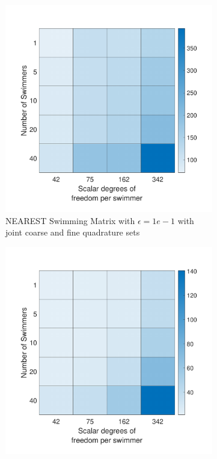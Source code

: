 \begin{figure}
\ContinuedFloat
    \begin{subfigure}{0.3\textwidth}
        \includegraphics[width=\linewidth]{Images/Condition/Mobility Matrix using Contained NEAREST-1.pdf}
        \caption{NEAREST Swimming Matrix with $\epsilon=1e-1$ with joint coarse and fine quadrature sets}        
    \end{subfigure}
    \begin{subfigure}{0.3\textwidth}
        \includegraphics[width=\linewidth]{Images/Condition/Mobility Matrix using Contained NEAREST-2.pdf}

\end{subfigure}
\end{figure}
